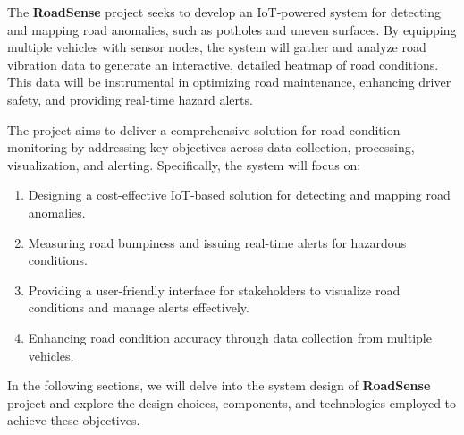 The \textbf{RoadSense} project seeks to develop an IoT-powered system for detecting and mapping road anomalies, such as potholes and uneven surfaces. By equipping multiple vehicles with sensor nodes, the system will gather and analyze road vibration data to generate an interactive, detailed heatmap of road conditions. This data will be instrumental in optimizing road maintenance, enhancing driver safety, and providing real-time hazard alerts.

The project aims to deliver a comprehensive solution for road condition monitoring by addressing key objectives across data collection, processing, visualization, and alerting. Specifically, the system will focus on:

\begin{enumerate}[label=\arabic*.]
	\item Designing a cost-effective IoT-based solution for detecting and mapping road anomalies.
	\item Measuring road bumpiness and issuing real-time alerts for hazardous conditions.
	\item Providing a user-friendly interface for stakeholders to visualize road conditions and manage alerts effectively.
	\item Enhancing road condition accuracy through data collection from multiple vehicles.
\end{enumerate}

\noindent In the following sections, we will delve into the system design of \textbf{RoadSense} project and explore the design choices, components, and technologies employed to achieve these objectives.

\pagebreak
